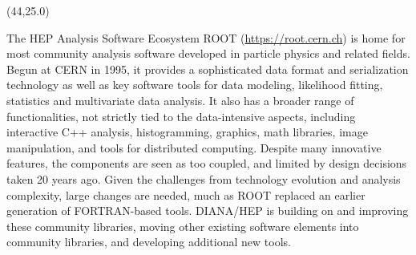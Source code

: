 \documentclass[final]{beamer}
\begin{document}
\begin{frame}{}






\begin{textblock}{38.0}(44,25.0)
\begin{block}{The HEP Analysis Software Ecosystem}
ROOT (\url{https://root.cern.ch}) is
home for most community analysis
software developed in particle physics and related fields. Begun at CERN in 1995,
it provides a sophisticated data format and serialization technology
as well as key software tools for
data modeling, likelihood fitting, statistics and
multivariate data analysis. It also has a broader range of
functionalities, not strictly tied to the data-intensive aspects,
including interactive C++ analysis, histogramming,
graphics, math libraries, image manipulation,
and tools for distributed computing. Despite many
innovative features, the components are seen as too coupled,
and limited by design decisions taken 20 years ago.
Given the challenges from technology evolution and analysis complexity,
large changes are needed,
much as ROOT replaced an earlier generation of
FORTRAN-based tools.
DIANA/HEP is building on and improving these
community libraries, moving other existing software elements into
community libraries, and developing additional new tools.
\end{block}
\end{textblock}




\end{frame}
\end{document}
